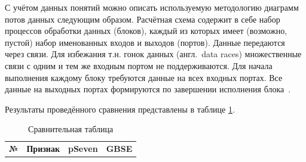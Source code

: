 С учётом данных понятий можно описать используемую методологию диаграмм потов данных следующим образом. Расчётная схема содержит в себе набор процессов обработки данных (блоков), каждый из которых имеет (возможно, пустой) набор именованных входов и выходов (портов). Данные передаются через связи. Для избежания т.н. гонок данных (англ.~data races) множественные связи с одним и тем же входным портом не поддерживаются. Для начала выполнения каждому блоку требуются данные на всех входных портах. Все данные на выходных портах формируются по завершении исполнения блока~\cite{NazarenkoDFM2015}.

Результаты проведённого сравнения представлены в таблице \ref{rndhpcblo.0209}.

\begin{landscape}
  \begin{longtable}{|p{}|p{}|p{}|p{}|}
    \caption{Сравнительная таблица}\label{rndhpcblo.0209}                                                                                                                                                                                                                                                                                                                                                                                                                                                                                                                                                                                                                                                                                                                                                                                                                                                                                                                                                                                                       \\
    \hline
    \textbf{№} & \textbf{Признак}                                                                                                                     & \textbf{pSeven}                                                                                                                                                                                                                                                                                                                                                                                                                                                                                                                                                                       & \textbf{GBSE}                                                                                                                                                                                                                                                                                                   \\

\end{longtable}
\end{landscape}
